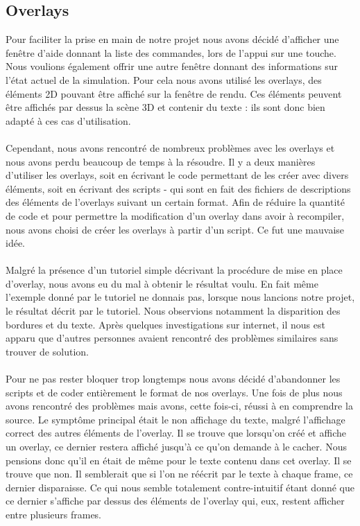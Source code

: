 \subsection{Overlays}
Pour faciliter la prise en main de notre projet nous avons décidé d'afficher
une fenêtre d'aide donnant la liste des commandes, lors de l'appui sur une
touche. Nous voulions également offrir une autre fenêtre donnant des
informations sur l'état actuel de la simulation.
Pour cela nous avons utilisé les overlays, des éléments 2D pouvant être
affiché sur la fenêtre de rendu. Ces éléments peuvent être affichés par dessus
la scène 3D et contenir du texte : ils sont donc bien adapté à ces cas
d'utilisation.

\paragraph{}
Cependant, nous avons rencontré de nombreux problèmes avec les overlays et
nous avons perdu beaucoup de temps à la résoudre. Il y a deux manières
d'utiliser les overlays, soit en écrivant le code permettant de les créer avec
divers éléments, soit en écrivant des scripts - qui sont en fait des fichiers
de descriptions des éléments de l'overlays suivant un certain format.
Afin de réduire la quantité de code et pour permettre la modification d'un
overlay dans avoir à recompiler, nous avons choisi de créer les overlays à
partir d'un script. Ce fut une mauvaise idée.

\paragraph{}
Malgré la présence d'un tutoriel simple décrivant la procédure de mise en
place d'overlay, nous avons eu du mal à obtenir le résultat voulu. En fait
même l'exemple donné par le tutoriel ne donnais pas, lorsque nous lancions
notre projet, le résultat décrit par le tutoriel. Nous observions notamment la
disparition des bordures et du texte. Après quelques investigations sur
internet, il nous est apparu que d'autres personnes avaient rencontré des
problèmes similaires sans trouver de solution.

\paragraph{}
Pour ne pas rester bloquer trop longtemps nous avons décidé d'abandonner les
scripts et de coder entièrement le format de nos overlays. Une fois de plus
nous avons rencontré des problèmes mais avons, cette fois-ci, réussi à en
comprendre la source. Le symptôme principal était le non affichage du texte,
malgré l'affichage correct des autres éléments de l'overlay. Il se trouve que
lorsqu'on créé et affiche un overlay, ce dernier restera affiché jusqu'à ce
qu'on demande à le cacher. Nous pensions donc qu'il en était de même pour le
texte contenu dans cet overlay. Il se trouve que non. Il semblerait que si
l'on ne réécrit par le texte à chaque frame, ce dernier disparaisse. Ce qui
nous semble totalement contre-intuitif étant donné que ce dernier s'affiche
par dessus des éléments de l'overlay qui, eux, restent afficher entre
plusieurs frames.

